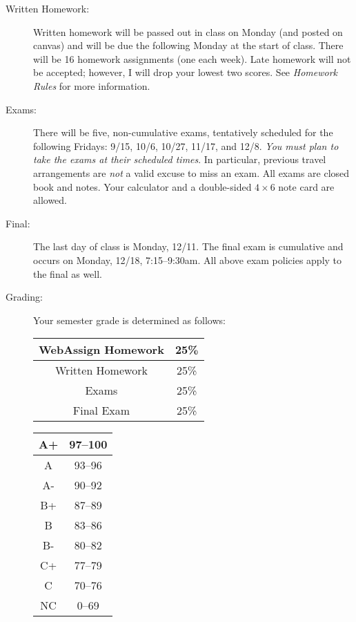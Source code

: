 \documentclass[letterpaper,12pt,fleqn]{article}
\begin{document}
\begin{description}
\item[Written Homework:] Written homework will be passed out in class on Monday (and
  posted on canvas) and will be due the following Monday at the start of class. There
  will be 16 homework assignments (one each week). Late homework will not be accepted;
  however, I will drop your lowest two scores. See \emph{Homework Rules} for more
  information.

\item[Exams:] There will be five, non-cumulative exams, tentatively scheduled for the
  following Fridays: 9/15, 10/6, 10/27, 11/17, and 12/8. \emph{You must plan to take the
    exams at their scheduled times}. In particular, previous travel arrangements are
  \emph{not} a valid excuse to miss an exam. All exams are closed book and notes. Your
  calculator and a double-sided $4\times6$ note card are allowed.

\item[Final:] The last day of class is Monday, 12/11. The final exam is cumulative and
  occurs on Monday, 12/18, 7:15--9:30am. All above exam policies apply to the final as
  well.

  \newpage

\item[Grading:]  Your semester grade is determined as follows:

  \bigskip

  \begin{minipage}{3in}
    \begin{tabular}{|c|c|}
      \hline
      WebAssign Homework & 25\% \\
      \hline
      Written Homework & 25\% \\
      \hline
      Exams & 25\% \\
      \hline
      Final Exam & 25\% \\
      \hline
    \end{tabular}
  \end{minipage}
  \begin{minipage}{3in}
    \begin{tabular}{|c|c|}
      \hline
      A+ & 97--100 \\
      \hline
      A & 93--96 \\
      \hline
      A- & 90--92 \\
      \hline
      B+ & 87--89 \\
      \hline
      B & 83--86 \\
      \hline
      B- & 80--82 \\
      \hline
      C+ & 77--79 \\
      \hline
      C & 70--76 \\
      \hline
      NC & 0--69 \\
      \hline
    \end{tabular}
  \end{minipage}
  

\end{description}
\end{document}
